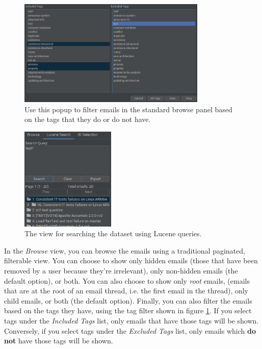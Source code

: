 \documentclass[a4paper, 12pt]{article}
\begin{document}
			\begin{figure}[h]
				\centering
				\includegraphics[width=0.8\textwidth]{img/edb-app_tag-filter-popup.png}
				\caption{Use this popup to filter emails in the standard browse panel based on the tags that they do or do not have.}
				\label{fig:edb-app-tag-filter}
			\end{figure}
		
			\begin{figure}
				\includegraphics[width=0.4\textwidth]{img/edb-app_lucene-search-narrow.png}
				\caption{The view for searching the dataset using Lucene queries.}
				\label{fig:edb-app-lucene-search}
			\end{figure}
		
			In the \textit{Browse} view, you can browse the emails using a traditional paginated, filterable view. You can choose to show only hidden emails (those that have been removed by a user because they're irrelevant), only non-hidden emails (the default option), or both. You can also choose to show only \textit{root} emails, (emails that are at the root of an email thread, i.e. the first email in the thread), only child emails, or both (the default option). Finally, you can also filter the emails based on the tags they have, using the tag filter shown in figure \ref{fig:edb-app-tag-filter}. If you select tags under the \textit{Included Tags} list, only emails that have those tags will be shown. Conversely, if you select tags under the \textit{Excluded Tags} list, only emails which \textbf{do not} have those tags will be shown.
			
\end{document}
